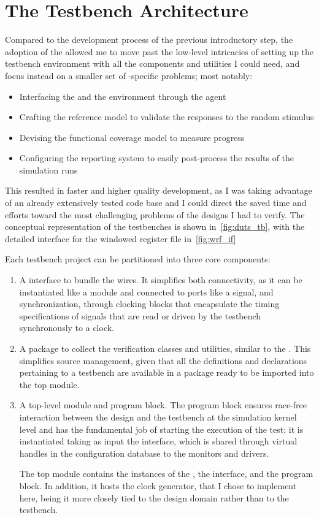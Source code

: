 \section{The Testbench Architecture}

Compared to the development process of the previous introductory step, the adoption of the \uvm allowed me to move past the low-level intricacies of setting up the testbench environment with all the components and utilities I could need, and focus instead on a smaller set of \dut-specific problems; most notably:
\begin{itemize}
    \item Interfacing the \dut and the environment through the agent
    \item Crafting the reference model to validate the \dut responses to the random stimulus
    \item Devising the functional coverage model to measure progress
    \item Configuring the reporting system to easily post-process the results of the simulation runs
\end{itemize}
This resulted in faster and higher quality development, as I was taking advantage of an already extensively tested code base and I could direct the saved time and efforts toward the most challenging problems of the designs I had to verify. The conceptual representation of the testbenches is shown in~\cref{fig:duts_tb}, with the detailed interface for the windowed register file in~\cref{fig:wrf_if}

Each testbench project can be partitioned into three core components:
\begin{enumerate}
    \item A \sv interface to bundle the \dut wires. It simplifies both connectivity, as it can be instantiated like a module and connected to ports like a signal, and synchronization, through clocking blocks that encapsulate the timing specifications of signals that are read or driven by the testbench synchronously to a clock.

    \item A \sv package to collect the verification classes and utilities, similar to the . This simplifies source management, given that all the definitions and declarations pertaining to a testbench are available in a package ready to be imported into the top module.

    \item A top-level module and program block. The program block ensures race-free interaction between the design and the testbench at the simulation kernel level and has the fundamental job of starting the execution of the \uvm test; it is instantiated taking as input the interface, which is shared through virtual handles in the configuration database to the monitors and drivers.

    The top module contains the instances of the \dut, the interface, and the program block. In addition, it hosts the clock generator, that I chose to implement here, being it more closely tied to the design domain rather than to the testbench. 
\end{enumerate}


